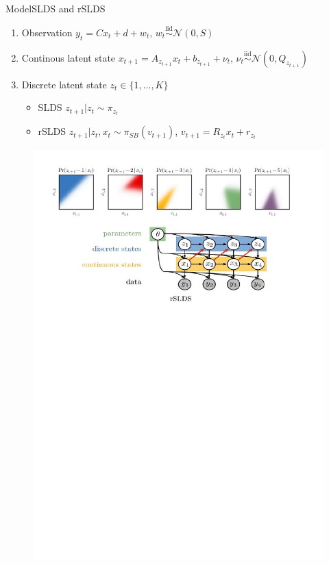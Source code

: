 \documentclass{beamer}
\begin{document}
\begin{frame}{Model}{SLDS and rSLDS}

\begin{tcolorbox}[colback=blue!10!white,colframe=blue!50!black,title=Model Set-up,boxrule=2pt, boxsep=0.1em, left=0.1em, right=0.1em,
fontupper=\fontsize{8}{10}\selectfont] %
\begin{enumerate}[\textbullet]
\item Observation $y_t=C x_t+d+w_t\text{, }w_t \overset{\mathrm{iid}}{\sim} \mathcal{N}(0,S)$
\item Continous latent state $x_{t+1}=A_{z_{t+1}}x_t+b_{z_{t+1}}+\nu_t \text{, } \nu_t \overset{\mathrm{iid}}{\sim} \mathcal{N}(0,Q_{z_{t+1}})$
    \item Discrete latent state $z_t \in \{1,\dots,K\}$
        \begin{itemize}
            \item SLDS 
$z_{t+1} | z_t \sim \pi_{z_t}$
            \item rSLDS
 $z_{t+1} | z_t, x_t \sim \pi_{SB}(v_{t+1})$, $v_{t+1}=R_{z_t}x_t+r_{z_t}$
        \end{itemize}
\end{enumerate}
\end{tcolorbox}

\begin{figure}
    \centering
    \includegraphics[width=0.7\linewidth]{gallery/model_p1.pdf}
    \caption{}
  \end{figure}




\end{frame}
\end{document}
